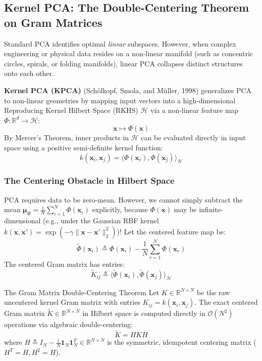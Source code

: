 \subsection{Kernel PCA: The Double-Centering Theorem on Gram Matrices}
Standard PCA identifies optimal \emph{linear} subspaces. However, when complex engineering or physical data resides on a non-linear manifold (such as concentric circles, spirals, or folding manifolds), linear PCA collapses distinct structures onto each other.

\textbf{Kernel PCA (KPCA)} (Schölkopf, Smola, and Müller, 1998) generalizes PCA to non-linear geometries by mapping input vectors into a high-dimensional Reproducing Kernel Hilbert Space (RKHS) $\mathcal{H}$ via a non-linear feature map $\Phi: \mathbb{R}^d \to \mathcal{H}$:
\begin{equation}
\mathbf{x} \mapsto \Phi(\mathbf{x})
\end{equation}
By Mercer's Theorem, inner products in $\mathcal{H}$ can be evaluated directly in input space using a positive semi-definite kernel function:
\begin{equation}
k(\mathbf{x}_i, \mathbf{x}_j) = \langle \Phi(\mathbf{x}_i), \Phi(\mathbf{x}_j) \rangle_{\mathcal{H}}
\end{equation}

\subsubsection{The Centering Obstacle in Hilbert Space}
PCA requires data to be zero-mean. However, we cannot simply subtract the mean $\boldsymbol{\mu}_{\Phi} = \frac{1}{N}\sum_{i=1}^N \Phi(\mathbf{x}_i)$ explicitly, because $\Phi(\mathbf{x})$ may be infinite-dimensional (e.g., under the Gaussian RBF kernel $k(\mathbf{x}, \mathbf{x}') = \exp(-\gamma \|\mathbf{x} - \mathbf{x}'\|_2^2)$)!
Let the centered feature map be:
\begin{equation}
\tilde{\Phi}(\mathbf{x}_i) \triangleq \Phi(\mathbf{x}_i) - \frac{1}{N}\sum_{r=1}^N \Phi(\mathbf{x}_r)
\end{equation}
The centered Gram matrix has entries:
\begin{equation}
\tilde{K}_{ij} \triangleq \langle \tilde{\Phi}(\mathbf{x}_i), \tilde{\Phi}(\mathbf{x}_j) \rangle_{\mathcal{H}}
\end{equation}

\begin{theorembox}{The Gram Matrix Double-Centering Theorem}
Let $K \in \mathbb{R}^{N \times N}$ be the raw uncentered kernel Gram matrix with entries $K_{ij} = k(\mathbf{x}_i, \mathbf{x}_j)$. The exact centered Gram matrix $\tilde{K} \in \mathbb{R}^{N \times N}$ in Hilbert space is computed directly in $\mathcal{O}(N^2)$ operations via algebraic double-centering:
\begin{equation}
\tilde{K} = H K H
\label{eq:kpca_double_centering}
\end{equation}
where $H \triangleq I_N - \frac{1}{N}\mathbf{1}_N \mathbf{1}_N^T \in \mathbb{R}^{N \times N}$ is the symmetric, idempotent centering matrix ($H^T = H, H^2 = H$).
\end{theorembox}

